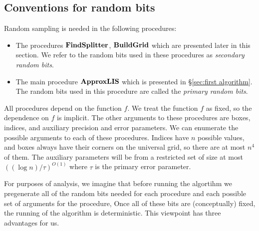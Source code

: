 \documentclass{acmsmall}
\newcommand{\Sec}[1]{\hyperref[sec:#1]{\S\ref*{sec:#1}}} %
\newcommand{\approxlis}{{\rm {\bf ApproxLIS}}}
\newcommand{\findsplitter}{{\rm {\bf FindSplitter}}}
\newcommand{\buildgrid}{{\rm {\bf BuildGrid}}}
\begin{document}
\subsection{Conventions for random bits}
\label{subsec:random}


Random sampling is needed  in the following procedures:

\begin{itemize}
\item
The procedures $\findsplitter$, $\buildgrid$ which are presented later in this section. 
We refer to the random bits used
in these procedures as {\em secondary random bits}. 
\item 
The main procedure $\approxlis$ which is presented in \Sec{first algorithm}.  
The random bits used in this procedure are called
the {\em primary random bits}.
\end{itemize}


All procedures depend on the function $f$. We treat the function $f$ as fixed, so the dependence on $f$ is implicit.  
The other arguments to these procedures are boxes, indices, and auxiliary precision and error parameters.
We can enumerate the possible arguments to each of these procedures.
Indices have $n$ possible values, and boxes always have their corners on the universal grid, so there are at most
$n^4$ of them.  The auxiliary parameters will be from a restricted set of size at most $((\log n)/\tau)^{O(1)}$ where
$\tau$ is the primary error parameter.
 
For purposes of analysis, we imagine that  before running the algortihm we pregenerate
all of the random bits needed for each procedure and each possible set of arguments for the procedure, 
Once all of these bits are (conceptually) fixed, the running of the algorithm
is deterministic.   This viewpoint has three advantages for us.
\end{document}
